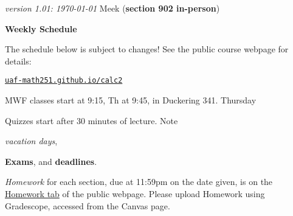 \documentclass[12pt]{article}
\newcommand{\vacinline}[1]{{\color{OliveGreen} \textsl{#1}}}
\newcommand{\vac}[1]{\strut {\small {\vacinline{#1}}}}
\newcommand{\due}[1]{\strut {\color{BrickRed} \textsl{#1}}}
\newcommand{\dl}[1]{{\small \color{Purple} \textbf{#1}}}
\newcommand{\ee}[1]{\strut {\color{Blue} \textbf{#1}}}
\newcommand{\qq}[1]{\strut {\color{RedOrange} #1}}
\begin{document}
\noindent\footnotesize \emph{version 1.01: \today} \normalsize \hfill Meek (\textbf{section 902 in-person})

\medskip
\centerline{\large \textbf{Weekly Schedule}}

\medskip
The schedule below is subject to changes!  See the public course webpage for details:

\medskip

\centerline{\href{https://uaf-math251.github.io/calc2/}{\texttt{uaf-math251.github.io/calc2}}}

\noindent MWF classes start at 9:15, Th at 9:45, in Duckering 341.
Thursday \qq{Quizzes} start after 30 minutes of lecture.  Note
\vac{vacation days}, \ee{Exams}, and \dl{deadlines}.  \due{Homework}
for each section, due at 11:59pm on the date given, is on the
\href{https://uaf-math251.github.io/calc2/}{Homework tab} of the
public webpage.  Please upload Homework using Gradescope, accessed
from the Canvas page.

\medskip
\end{document}

